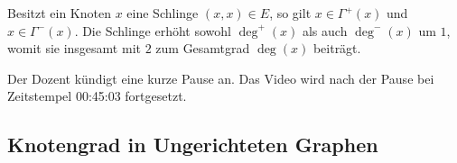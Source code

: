 \begin{math-stroke}

\begin{example}
Besitzt ein Knoten $x$ eine Schlinge $(x, x) \in E$, so gilt $x \in \Gamma^+(x)$ und $x \in \Gamma^-(x)$. Die Schlinge erhöht sowohl $\operatorname{deg}^+(x)$ als auch $\operatorname{deg}^-(x)$ um $1$, womit sie insgesamt mit $2$ zum Gesamtgrad $\operatorname{deg}(x)$ beiträgt.
\end{example}
\end{math-stroke}

\begin{lecture-break}[Vorlesungspause]
Der Dozent kündigt eine kurze Pause an. Das Video wird nach der Pause bei Zeitstempel 00:45:03 fortgesetzt.
\end{lecture-break}

\subsection{Knotengrad in Ungerichteten Graphen}

